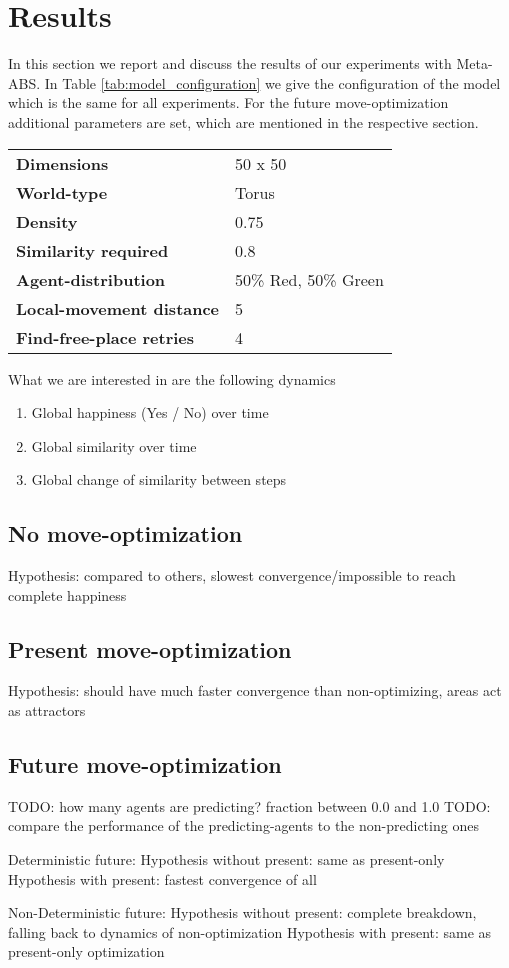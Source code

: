 \section{Results}
In this section we report and discuss the results of our experiments with Meta-ABS. In Table \ref{tab:model_configuration} we give the configuration of the model which is the same for all experiments. For the future move-optimization additional parameters are set, which are mentioned in the respective section.

\begin{table*}[t]
	\centering
	\caption{Model Configuration}
	\label{tab:model_configuration}
		\begin{tabular}{ l | l }
			\hline \hline
			\textbf{Dimensions}					& 50 x 50 \\  
			\textbf{World-type}					& Torus	\\ 
			\textbf{Density}					& 0.75	\\ 
			\textbf{Similarity required}		& 0.8	\\ 
			\textbf{Agent-distribution}			& 50\% Red, 50\% Green	\\ 
			\textbf{Local-movement distance}	& 5	\\ 
			\textbf{Find-free-place retries}	& 4	\\ 
			\hline \hline
		\end{tabular}
\end{table*}


What we are interested in are the following dynamics
\begin{enumerate}
	\item Global happiness (Yes / No) over time
	\item Global similarity over time
	\item Global change of similarity between steps
\end{enumerate}

\subsection{No move-optimization}
Hypothesis: compared to others, slowest convergence/impossible to reach complete happiness
	
\subsection{Present move-optimization}
Hypothesis: should have much faster convergence than non-optimizing, areas act as attractors
	
\subsection{Future move-optimization}
TODO: how many agents are predicting? fraction between 0.0 and 1.0
TODO: compare the performance of the predicting-agents to the non-predicting ones

Deterministic future:
	Hypothesis without present:  	same as present-only
	Hypothesis with present: 		fastest convergence of all
		
Non-Deterministic future:
	Hypothesis without present: 	complete breakdown, falling back to dynamics of non-optimization
	Hypothesis with present: 		same as present-only optimization